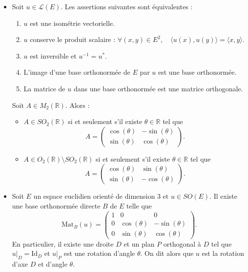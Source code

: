 \documentclass{article}
\begin{document}
\begin{itemize}[label=$\ast$]
\item 
Soit $u \in \mathcal{L}(E)$. Les assertions suivantes sont équivalentes :
\begin{enumerate}
    \item $u$ est une isométrie vectorielle.
    \item $u$ conserve le produit scalaire : $\forall (x, y) \in E^2, \quad \langle u(x), u(y) \rangle = \langle x, y \rangle$.
    \item $u$ est inversible et $u^{-1} = u^*$.
    \item L'image d'une base orthonormée de $E$ par $u$ est une base orthonormée.
    \item La matrice de $u$ dans une base orthonormée est une matrice orthogonale.
\end{enumerate}

Soit $A \in M_2(\mathbb{R})$. Alors :
\begin{itemize}
    \item $A \in SO_2(\mathbb{R})$ si et seulement s'il existe $\theta \in \mathbb{R}$ tel que\[A = \begin{pmatrix}\cos(\theta) & -\sin(\theta) \\\sin(\theta) & \cos(\theta)\end{pmatrix}. \]  \item $A \in O_2(\mathbb{R}) \setminus SO_2(\mathbb{R})$ si et seulement s'il existe $\theta \in \mathbb{R}$ tel que \[A = \begin{pmatrix}
 \cos(\theta) & \sin(\theta) \\
    \sin(\theta) & -\cos(\theta)
    \end{pmatrix}.
    \]
\end{itemize}

\item Soit $E$ un espace euclidien orienté de dimension $3$ et $u \in SO(E)$. Il existe une base orthonormée directe $B$ de $E$ telle que
\[
\text{Mat}_B(u) = \begin{pmatrix}
1 & 0 & 0 \\
0 & \cos(\theta) & -\sin(\theta) \\
0 & \sin(\theta) & \cos(\theta)
\end{pmatrix}.
\]
En particulier, il existe une droite $D$ et un plan $P$ orthogonal à $D$ tel que $u|_D = \text{Id}_D$ et $u|_P$ est une rotation d'angle $\theta$. On dit alors que $u$ est la rotation d'axe $D$ et d'angle $\theta$.










\end{itemize}
\end{document}
